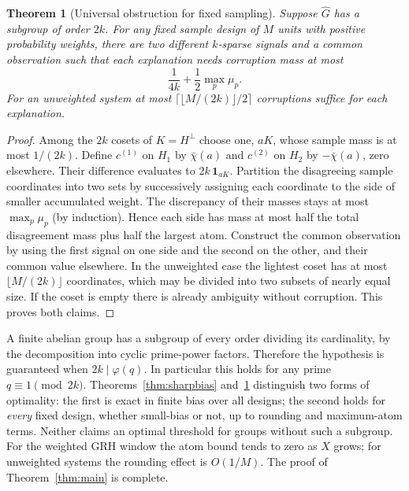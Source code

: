 \documentclass[11pt]{article}
\newtheorem{theorem}{Theorem}[section]
\theoremstyle{remark}\newtheorem{remark}[theorem]{Remark}
\begin{document}
\begin{theorem}[Universal obstruction for fixed sampling]\label{thm:obstruct}
Suppose $\widehat G$ has a subgroup of order $2k$. For any fixed sample design of $M$ units with positive probability weights, there are two different $k$-sparse signals and a common observation such that each explanation needs corruption mass at most
\begin{equation}\label{eq:obstruct}
 \frac1{4k}+\frac12\max_p\mu_p.
\end{equation}
For an unweighted system at most $\lceil\lfloor M/(2k)\rfloor/2\rceil$ corruptions suffice for each explanation.
\end{theorem}
\begin{proof}
Among the $2k$ cosets of $K=H^\perp$ choose one, $aK$, whose sample mass is at most $1/(2k)$. Define $c^{(1)}$ on $H_1$ by $\bar\chi(a)$ and $c^{(2)}$ on $H_2$ by $-\bar\chi(a)$, zero elsewhere. Their difference evaluates to $2k\,\mathbf1_{aK}$. Partition the disagreeing sample coordinates into two sets by successively assigning each coordinate to the side of smaller accumulated weight. The discrepancy of their masses stays at most $\max_p\mu_p$ (by induction). Hence each side has mass at most half the total disagreement mass plus half the largest atom. Construct the common observation by using the first signal on one side and the second on the other, and their common value elsewhere. In the unweighted case the lightest coset has at most $\lfloor M/(2k)\rfloor$ coordinates, which may be divided into two subsets of nearly equal size. If the coset is empty there is already ambiguity without corruption. This proves both claims.
\end{proof}
A finite abelian group has a subgroup of every order dividing its cardinality, by the decomposition into cyclic prime-power factors. Therefore the hypothesis is guaranteed when $2k\mid\varphi(q)$. In particular this holds for any prime $q\equiv1\pmod{2k}$. Theorems~\ref{thm:sharpbias} and~\ref{thm:obstruct} distinguish two forms of optimality: the first is exact in finite bias over all designs; the second holds for \emph{every} fixed design, whether small-bias or not, up to rounding and maximum-atom terms. Neither claims an optimal threshold for groups without such a subgroup. For the weighted GRH window the atom bound tends to zero as $X$ grows; for unweighted systems the rounding effect is $O(1/M)$. The proof of Theorem~\ref{thm:main} is complete.
\end{document}
